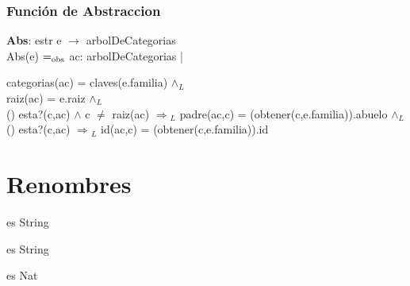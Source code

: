 \documentclass[10pt, a4paper]{article}
\begin{document}
\subsubsection{\Large Funci\'{o}n de Abstraccion}

	    \textbf{Abs}: estr e $\rightarrow$ arbolDeCategorias \\
   	    Abs(e) $=_{\mathrm{obs}}$ ac: arbolDeCategorias | \\
   	   \begin{flushright}
 categorias(ac) = claves(e.familia) $\wedge{_L}$ \\
   	    raiz(ac) = e.raiz $\wedge{_L}$ \\
   	    () esta?(c,ac) $\wedge$ c $\neq$ raiz(ac) $\Rightarrow{_L}$
   	    padre(ac,c) = (obtener(c,e.familia)).abuelo $\wedge{_L}$ \\
   	    () esta?(c,ac) $\Rightarrow{_L}$ id(ac,c) = 		(obtener(c,e.familia)).id
\end{flushright}
		
		
\section{Renombres}
\begin{tad}{} es String
\end{tad}


\begin{tad}{} es String
\end{tad}

\begin{tad}{} es Nat
\end{tad}
\end{document}
